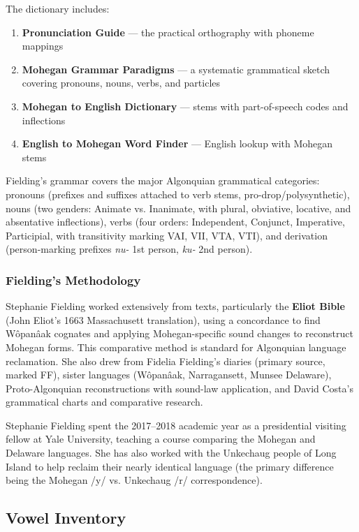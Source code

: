 The dictionary includes:
\begin{enumerate}
  \item \textbf{Pronunciation Guide} --- the practical orthography with
    phoneme mappings
  \item \textbf{Mohegan Grammar Paradigms} --- a systematic grammatical
    sketch covering pronouns, nouns, verbs, and particles
  \item \textbf{Mohegan to English Dictionary} --- stems with part-of-speech
    codes and inflections
  \item \textbf{English to Mohegan Word Finder} --- English lookup with
    Mohegan stems
\end{enumerate}

Fielding's grammar covers the major Algonquian grammatical categories:
pronouns (prefixes and suffixes attached to verb stems, pro-drop/polysynthetic),
nouns (two genders: Animate vs. Inanimate, with plural, obviative, locative,
and absentative inflections), verbs (four orders: Independent, Conjunct,
Imperative, Participial, with transitivity marking VAI, VII, VTA, VTI), and
derivation (person-marking prefixes \textit{nu-} 1st person, \textit{ku-}
2nd person).

\subsubsection{Fielding's Methodology}

Stephanie Fielding worked extensively from texts, particularly the
\textbf{Eliot Bible} (John Eliot's 1663 Massachusett translation), using a
concordance to find Wôpanâak cognates and applying Mohegan-specific sound
changes to reconstruct Mohegan forms. This comparative method is standard for
Algonquian language reclamation. She also drew from Fidelia Fielding's diaries
(primary source, marked FF), sister languages (Wôpanâak, Narragansett, Munsee
Delaware), Proto-Algonquian reconstructions with sound-law application, and
David Costa's grammatical charts and comparative research.

Stephanie Fielding spent the 2017--2018 academic year as a presidential
visiting fellow at Yale University, teaching a course comparing the Mohegan
and Delaware languages. She has also worked with the Unkechaug people of Long
Island to help reclaim their nearly identical language (the primary difference
being the Mohegan /y/ vs. Unkechaug /r/ correspondence).

\subsection{Vowel Inventory}

